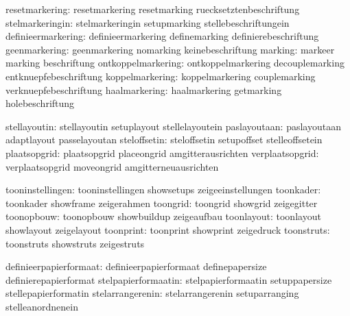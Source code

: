                resetmarkering:  resetmarkering               resetmarking
                                ruecksetztenbeschriftung
              stelmarkeringin:  stelmarkeringin              setupmarking
                                stellebeschriftungein
           definieermarkering:  definieermarkering           definemarking
                                definierebeschriftung
                geenmarkering:  geenmarkering                nomarking
                                keinebeschriftung
                      marking:  markeer                      marking
                                beschriftung
           ontkoppelmarkering:  ontkoppelmarkering           decouplemarking
                                entknuepfebeschriftung
              koppelmarkering:  koppelmarkering              couplemarking
                                verknuepfebeschriftung
                haalmarkering:  haalmarkering                getmarking
                                holebeschriftung

                 stellayoutin:  stellayoutin                 setuplayout
                                stellelayoutein
                 paslayoutaan:  paslayoutaan                 adaptlayout
                                passelayoutan
                 steloffsetin:  steloffsetin                 setupoffset
                                stelleoffsetein
                 plaatsopgrid:  plaatsopgrid                 placeongrid
                                amgitterausrichten
              verplaatsopgrid:  verplaatsopgrid              moveongrid
                                amgitterneuausrichten

             tooninstellingen:  tooninstellingen             showsetups
                                zeigeeinstellungen
                    toonkader:  toonkader                    showframe
                                zeigerahmen
                     toongrid:  toongrid                     showgrid
                                zeigegitter
                   toonopbouw:  toonopbouw                   showbuildup
                                zeigeaufbau
                   toonlayout:  toonlayout                   showlayout
                                zeigelayout
                    toonprint:  toonprint                    showprint
                                zeigedruck
                   toonstruts:  toonstruts                   showstruts
                                zeigestruts

       definieerpapierformaat:  definieerpapierformaat       definepapersize
                                definierepapierformat
          stelpapierformaatin:  stelpapierformaatin          setuppapersize
                                stellepapierformatin
             stelarrangerenin:  stelarrangerenin             setuparranging
                                stelleanordnenein


